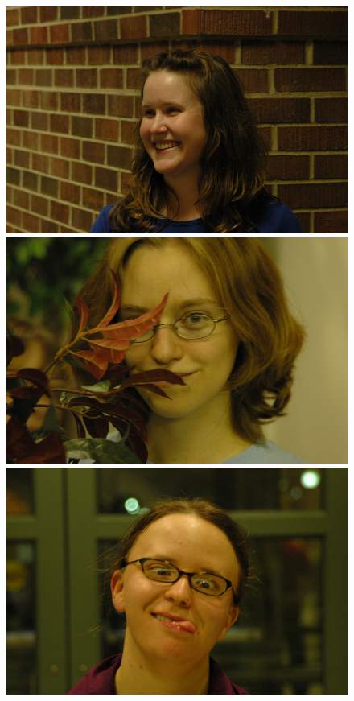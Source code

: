 \begin{figure}
\includegraphics[scale=0.35,clip=true]{figures_cvpr/examples/5/success/DSC_1871.jpg} 
\includegraphics[scale=0.35,clip=true]{figures_cvpr/examples/5/success/DSC_1913.jpg} 
\includegraphics[scale=0.35,clip=true]{figures_cvpr/examples/5/success/DSC_2005.jpg} \\

\end{figure}
